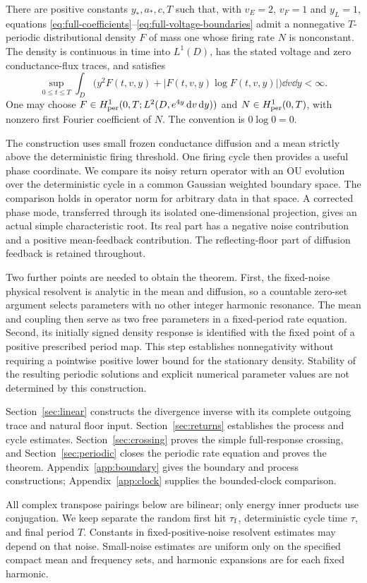 \begin{theorem}\label{thm:main}
There are positive constants $y_*,a_*,c,T$ such that, with
$v_E=2$, $v_F=1$ and $y_L=1$, equations
\eqref{eq:full-coefficients}--\eqref{eq:full-voltage-boundaries}
admit a nonnegative $T$-periodic distributional density $F$
of mass one whose firing rate $N$ is nonconstant.
The density is continuous in time into $L^1(D)$, has the
stated voltage and zero conductance-flux traces, and satisfies
\begin{equation}\label{eq:main-moment-entropy}
 \sup_{0\le t\le T}\int_D
       \bigl(y^2F(t,v,y)+|F(t,v,y)\log F(t,v,y)|\bigr)\dd v\dd y<\infty .
\end{equation}
One may choose
$F\in H^1_{\mathrm{per}}(0,T;L^2(D,e^{4y}\,\mathrm d v\,\mathrm d y))$ and
$N\in H^1_{\mathrm{per}}(0,T)$, with nonzero first Fourier coefficient
of $N$. The convention is $0\log0=0$.
\end{theorem}

The construction uses small frozen conductance diffusion and a mean
strictly above the deterministic firing threshold. One firing cycle
then provides a useful phase coordinate. We compare its noisy return
operator with an OU evolution over the deterministic cycle in a
common Gaussian weighted boundary space. The comparison holds in
operator norm for arbitrary data in that space. A corrected phase
mode, transferred through its isolated one-dimensional projection,
gives an actual simple characteristic root. Its real part has a
negative noise contribution and a positive mean-feedback contribution.
The reflecting-floor part of diffusion feedback is retained throughout.

Two further points are needed to obtain the theorem. First, the
fixed-noise physical resolvent is analytic in the mean and diffusion,
so a countable zero-set argument selects parameters with no other
integer harmonic resonance. The mean and coupling then serve as
two free parameters in a fixed-period rate equation. Second, its
initially signed density response is identified with the fixed
point of a positive prescribed period map. This step establishes
nonnegativity without requiring a pointwise positive lower bound
for the stationary density. Stability of the resulting periodic
solutions and explicit numerical parameter values are not determined
by this construction.

Section~\ref{sec:linear} constructs the divergence inverse with its
complete outgoing trace and natural floor input.
Section~\ref{sec:returns} establishes the process and cycle estimates.
Section~\ref{sec:crossing} proves the simple full-response crossing,
and Section~\ref{sec:periodic} closes the periodic rate equation and
proves the theorem. Appendix~\ref{app:boundary} gives the boundary
and process constructions; Appendix~\ref{app:clock} supplies the
bounded-clock comparison.

All complex transpose pairings below are bilinear; only energy
inner products use conjugation. We keep separate the random first
hit ${\tau_{\mathrm f}}$, deterministic cycle time $\tau$, and final period $T$.
Constants in fixed-positive-noise resolvent estimates may depend on
that noise. Small-noise estimates are uniform only on the specified
compact mean and frequency sets, and harmonic expansions are for
each fixed harmonic.

